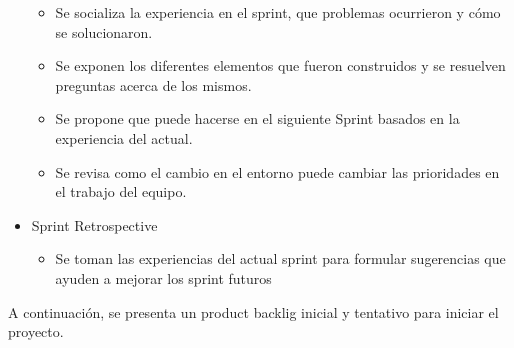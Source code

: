 \begin{itemize}
\begin{itemize}
	  \item Se socializa la experiencia en el sprint, que problemas ocurrieron y cómo se solucionaron.
	  \item Se exponen los diferentes elementos que fueron construidos y se resuelven preguntas acerca de los mismos.
	  \item Se propone que puede hacerse en el siguiente Sprint basados en la experiencia del actual.
	  \item Se revisa como el cambio en el entorno puede cambiar las prioridades en el trabajo del equipo.
	\end{itemize}
  \item Sprint Retrospective
  \begin{itemize}
    \item Se toman las experiencias del actual sprint para formular sugerencias que ayuden a mejorar los sprint futuros

  \end{itemize}
\end{itemize}

A continuación, se presenta un product backlig inicial y tentativo para iniciar el proyecto.


